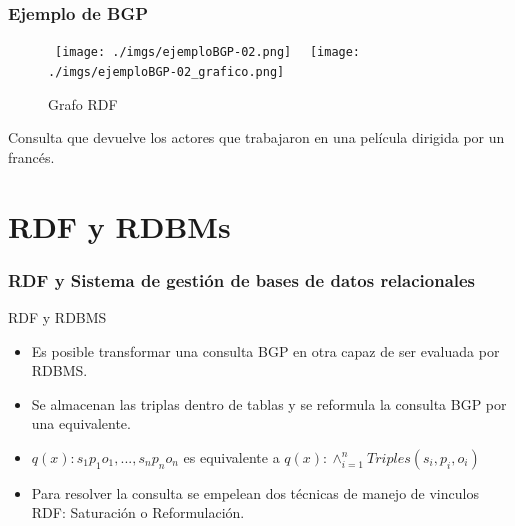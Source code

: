 \documentclass{beamer}
\begin{document}
\begin{frame}
\frametitle{Ejemplo de BGP}
\begin{figure}
        \hbox{%
                \texttt{[image: ./imgs/ejemploBGP-02.png]}%
        }%
        \hbox{%
                \texttt{[image: ./imgs/ejemploBGP-02\_grafico.png]}%
        }%
        \ifdim\ht0>\ht2
                \setbox0\hbox{%
                        \texttt{[image: ./imgs/ejemploBGP-02.png]}%
                }%
        \else
                \setbox2\hbox{%
                        \texttt{[image: ./imgs/ejemploBGP-02\_grafico.png]}%
                }%
        \fi
        \noindent
        \parbox{.45\textwidth}{%
                \centering
                \caption{Consulta RDF}
                \label{fg:methods}
        }%
        \hfil
        \parbox{.45\textwidth}{%
                \centering
                \caption{Grafo RDF}
                \label{fg:method_detail}
        }%
\end{figure}
\vspace*{1.2cm}
Consulta que devuelve los actores que trabajaron en una película dirigida por un francés.
\end{frame}

\section{RDF y RDBMs}
\begin{frame}
\frametitle{RDF y Sistema de gestión de bases de datos relacionales}
\begin{block}{RDF y RDBMS}
\begin{itemize}
\item{Es posible transformar una consulta BGP en otra capaz de ser evaluada por RDBMS.}
\item{Se almacenan las triplas dentro de tablas y se reformula la consulta BGP por una equivalente.}
\item{$q(x) : s_{1} p_{1} o_{1}, ..., s_{n} p_{n} o_{n}$ es equivalente a $q(x): \wedge ^n _{i = 1} Triples(s_{i}, p_{i}, o_{i})$}
\item{Para resolver la consulta se empelean dos técnicas de manejo de vinculos RDF: Saturación o Reformulación.}
\end{itemize}
\end{block}
\end{frame}
\end{document}

